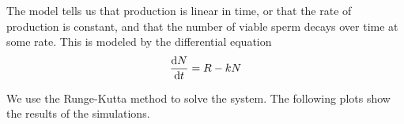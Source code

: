 \documentclass[12pt]{article}
\begin{document}
The model tells us that production is linear in time, or that the rate of production is constant, and that the number of viable sperm decays over time at some rate. This is modeled by the differential equation
\begin{eqnarray*}
    \dv{N}{t} = R - kN
\end{eqnarray*}

We use the Runge-Kutta method to solve the system. The following plots show the results of the simulations.
\end{document}
